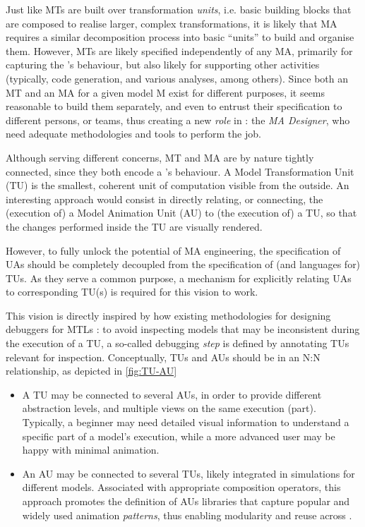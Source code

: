 Just like MTs are built over transformation \emph{units}, i.e. basic building blocks
that are composed to realise larger, complex transformations, it is likely that 
MA requires a similar decomposition process into basic ``units'' to build and 
organise them. However, MTs are likely specified independently of any MA, primarily
for capturing the \DSL's behaviour, but also likely for supporting other activities
(typically, code generation, and various analyses, among others). Since both an MT
and an MA for a given model \textsf{M} exist for different purposes, it seems 
reasonable to build them separately, and even to entrust their specification to
different persons, or teams, thus creating a new \emph{role} in \MDE: the 
\emph{MA Designer}, who need adequate methodologies and tools to perform the job.

Although serving different concerns, MT and MA are by nature tightly connected,
since they both encode a \DSL's behaviour. A Model Transformation Unit (TU) is the
smallest, coherent unit of computation visible from the outside. An interesting
approach would consist in directly relating, or connecting, the (execution of) a
Model Animation Unit (AU) to (the execution of) a TU, so that the changes performed
inside the TU are visually rendered. 

However, to fully unlock the potential of MA engineering, the specification of UAs
should be completely decoupled from the specification of (and languages for) TUs.
As they serve a common purpose, a mechanism for explicitly relating UAs to corresponding
TU(s) is required for this vision to work. 

This vision is directly inspired by how existing methodologies for designing 
debuggers for MTLs \citep{bousse2018omniscient,J:VanMierlo-Vangheluwe-etAl:2020}:
to avoid inspecting models that may be inconsistent during the execution of a TU,
a so-called debugging \emph{step} is defined by annotating TUs relevant for inspection.
Conceptually, TUs and AUs should be in an \textsf{N:N} relationship, as depicted
in \autoref{fig:TU-AU}
\begin{itemize}
	\item A TU may be connected to several AUs, in order to provide different abstraction
   levels, and multiple views on the same execution (part). Typically, a beginner
   may need detailed visual information to understand a specific part of a model's
   execution, while a more advanced user may be happy with minimal animation.

   \item An AU may be connected to several TUs, likely integrated in simulations
   for different models. Associated with appropriate composition operators, this
   approach promotes the definition of AUs libraries that capture popular and 
   widely used animation \emph{patterns}, thus enabling modularity and reuse 
   across \DSLs.
\end{itemize}

